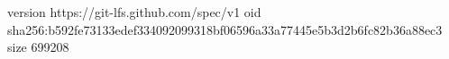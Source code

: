 version https://git-lfs.github.com/spec/v1
oid sha256:b592fe73133edef334092099318bf06596a33a77445e5b3d2b6fc82b36a88ec3
size 699208
